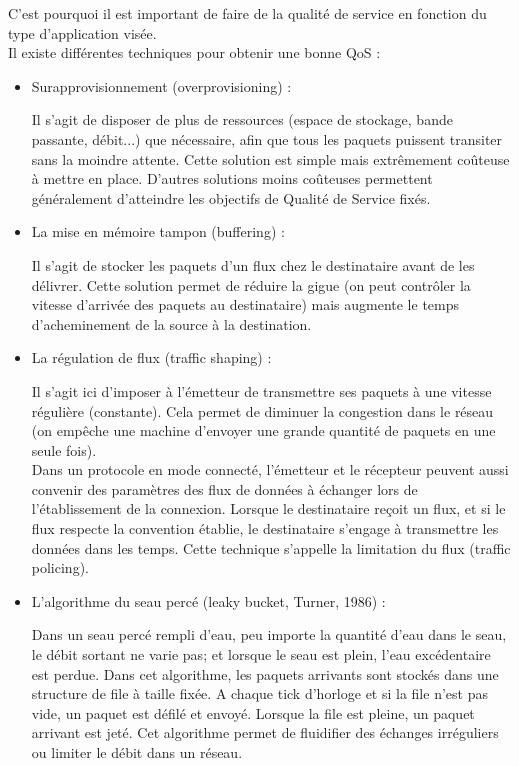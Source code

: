 C'est pourquoi il est important de faire de la qualité de service en fonction du type d'application visée.\\

Il existe différentes techniques pour obtenir une bonne QoS :\\

\begin{itemize}
\item Surapprovisionnement (overprovisioning) :

Il s'agit de disposer de plus de ressources (espace de stockage, bande passante, débit...) que nécessaire, afin que tous les paquets puissent transiter sans la moindre attente. Cette solution est simple mais extrêmement coûteuse à mettre en place. D'autres solutions moins coûteuses permettent généralement d'atteindre les objectifs de Qualité de Service fixés. \\
\item La mise en mémoire tampon (buffering) :

Il s'agit de stocker les paquets d'un flux chez le destinataire avant de les délivrer. Cette solution permet de réduire la gigue (on peut contrôler la vitesse d'arrivée des paquets au destinataire) mais augmente le temps d'acheminement de la source à la destination.\\

\item La régulation de flux (traffic shaping) :

Il s'agit ici d'imposer à l'émetteur de transmettre ses paquets à une vitesse régulière (constante). Cela permet de diminuer la congestion dans le réseau (on empêche une machine d'envoyer une grande quantité de paquets en une seule fois).\\ Dans un protocole en mode connecté, l'émetteur et le récepteur peuvent aussi convenir des paramètres des flux de données à échanger lors de l'établissement de la connexion. Lorsque le destinataire reçoit un flux, et si le flux respecte la convention établie, le destinataire s'engage à transmettre les données dans les temps. Cette technique s'appelle la limitation du flux (traffic policing).\\

\item L'algorithme du seau percé (leaky bucket, Turner, 1986) :

Dans un seau percé rempli d'eau, peu importe la quantité d'eau dans le seau, le débit sortant ne varie pas; et lorsque le seau est plein, l'eau excédentaire est perdue. Dans cet algorithme, les paquets arrivants sont stockés dans une structure de file à taille fixée. A chaque tick d'horloge et si la file n'est pas vide, un paquet est défilé et envoyé. Lorsque la file est pleine, un paquet arrivant est jeté. Cet algorithme permet de fluidifier des échanges irréguliers ou limiter le débit dans un réseau.\\


\end{itemize}
